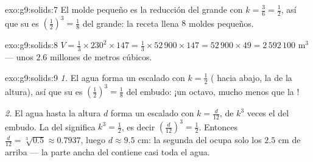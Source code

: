 \begin{solution}{exo:g9:solids:7}
El molde pequeño es la reducción del grande con $k = \frac36 =
\frac12$, así que su  es $\left(\frac12\right)^3 = \frac18$ del
grande: la receta llena $8$ moldes pequeños.
\end{solution}

\begin{solution}{exo:g9:solids:8}
$V = \frac13 \times 230^2 \times 147 = \frac13 \times 52\,900 \times 147
= 52\,900 \times 49 = 2\,592\,100$ m$^3$ --- unos $2.6$ millones de metros
cúbicos.
\end{solution}

\begin{solution}{exo:g9:solids:9}
\emph{1.} El agua forma un  escalado con $k = \frac12$ ( hacia abajo,
la  de la altura), así que su  es $\left(\frac12\right)^3 = \frac18$
del embudo: ¡un octavo, mucho menos que la !

\emph{2.} El agua hasta la altura $d$ forma un  escalado con
$k = \frac{d}{12}$, de  $k^3$ veces el del embudo. La  del 
significa $k^3 = \frac12$, es decir
$\left(\frac{d}{12}\right)^3 = \frac12$. Entonces
$\frac{d}{12} = \sqrt[3]{0.5} \approx 0.7937$, luego
$d \approx 9.5$ cm: la segunda  del  ocupa solo los
$2.5$ cm de arriba --- la parte ancha del  contiene casi toda el agua.
\end{solution}

